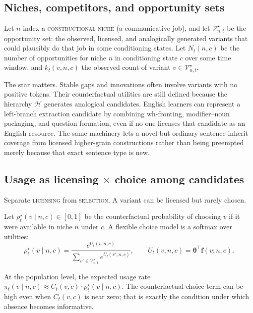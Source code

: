 \documentclass[12pt,letterpaper]{article}
\newcommand{\term}[1]{\textsc{#1}}
\begin{document}
\subsection{Niches, competitors, and opportunity sets}
\label{sec:niches}

Let $n$ index a \term{constructional niche} (a communicative job), and let
$\mathcal{V}_{n,t}^{\star}$ be the opportunity set: the observed, licensed, and
analogically generated variants that could plausibly do that job in some
conditioning states.
Let $N_t(n,c)$ be the number of opportunities for niche $n$ in conditioning state $c$
over some time window, and $k_t(v,n,c)$ the observed count of variant
$v\in\mathcal{V}_{n,t}^{\star}$.

The star matters. Stable gaps and innovations often involve variants with no
positive tokens. Their counterfactual utilities are still defined because the
hierarchy $\mathcal{H}$ generates analogical candidates. English learners can
represent a left-branch extraction candidate by combining wh-fronting,
modifier--noun packaging, and question formation, even if no one licenses that
candidate as an English resource. The same machinery lets a novel but ordinary
sentence inherit coverage from licensed higher-grain constructions rather than
being preempted merely because that exact sentence type is new.

\subsection{Usage as \texorpdfstring{licensing $\times$ choice}{licensing x choice} among candidates}
\label{sec:usage}

Separate \term{licensing} from \term{selection}. A variant can be licensed but rarely chosen.

Let $\rho_t^\star(v\mid n,c)\in[0,1]$ be the counterfactual probability of
choosing $v$ if it were available in niche $n$ under $c$. A flexible choice
model is a softmax over utilities:
$$
\rho_t^\star(v\mid n,c)=
\frac{e^{U_t(v;n,c)}}{\sum_{v'\in\mathcal{V}_{n,t}^{\star}}e^{U_t(v';n,c)}},
\qquad
U_t(v;n,c)=\boldsymbol{\theta}^{\top}\mathbf{f}(v;n,c).
$$

At the population level, the expected usage rate
$\pi_t(v\mid n,c)\approx C_t(v,c)\cdot \rho_t^\star(v\mid n,c)$. The
counterfactual choice term can be high even when $C_t(v,c)$ is near zero; that
is exactly the condition under which absence becomes informative.
\end{document}
